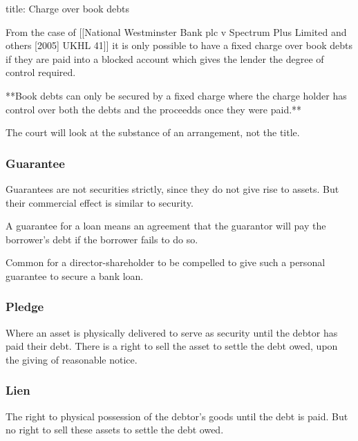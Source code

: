 \documentclass[
]{article}
\newenvironment{Shaded}{}{}
\newcommand{\NormalTok}[1]{#1}
\begin{document}
\begin{Shaded}
\begin{Highlighting}[]
\NormalTok{title: Charge over book debts}

\NormalTok{From the case of [[National Westminster Bank plc v Spectrum Plus Limited and others [2005] UKHL 41]] it is only possible to have a fixed charge over book debts if they are paid into a blocked account which gives the lender the degree of control required.}

\NormalTok{**Book debts can only be secured by a fixed charge where the charge holder has control over both the debts and the proceedds once they were paid.**}
\end{Highlighting}
\end{Shaded}

The court will look at the substance of an arrangement, not the title.

\hypertarget{guarantee}{%
\subsubsection{Guarantee}\label{guarantee}}

Guarantees are not securities strictly, since they do not give rise to
assets. But their commercial effect is similar to security.

A guarantee for a loan means an agreement that the guarantor will pay
the borrower's debt if the borrower fails to do so.

Common for a director-shareholder to be compelled to give such a
personal guarantee to secure a bank loan.

\hypertarget{pledge}{%
\subsubsection{Pledge}\label{pledge}}

Where an asset is physically delivered to serve as security until the
debtor has paid their debt. There is a right to sell the asset to settle
the debt owed, upon the giving of reasonable notice.

\hypertarget{lien}{%
\subsubsection{Lien}\label{lien}}

The right to physical possession of the debtor's goods until the debt is
paid. But no right to sell these assets to settle the debt owed.
\end{document}
